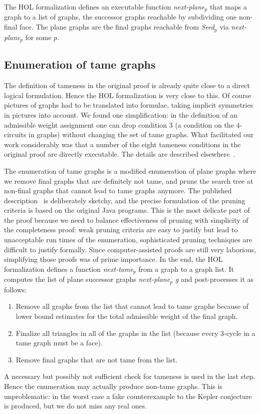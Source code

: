 \documentclass[11pt]{amsart}
\begin{document}
The HOL formalization defines an executable function
\textit{next-plane$_p$} that maps a
graph to a list of graphs, the successor graphs reachable by subdividing one
non-final face.  The plane graphs are the final graphs reachable from
\textit{Seed$_p$} via \textit{next-plane$_p$} for some $p$.

\subsection*{Enumeration of tame graphs}

The definition of tameness in the original proof is already quite close to a direct logical
formulation. Hence the HOL formalization is very close to this. Of course
pictures of graphs had to be translated into formulae, taking implicit
symmetries in pictures into account. We found one simplification: in the
definition of an admissible weight assignment one can drop condition 3
(a condition on the $4$-circuits in graphs)
without changing the set of tame graphs. What facilitated our work
considerably was that a number of the eight tameness conditions 
in the original proof are directly
executable. The details are described elsewhere~\cite{NipkowBS-IJCAR06}.

The enumeration of tame graphs is a modified enumeration of plane graphs
where we remove final graphs that are definitely not tame, and prune the
search tree at non-final graphs that cannot lead to tame graphs anymore.  
The published
description~\cite{Hales:2006:DCG} is deliberately sketchy, and 
the precise formulation of the pruning criteria is based on the
original Java programs.  This
is the most delicate part of the proof because we need to balance
effectiveness of pruning with simplicity of the completeness proof: weak
pruning criteria are easy to justify but lead to unacceptable run times of
the enumeration, sophisticated pruning techniques are difficult to justify
formally. Since computer-assisted proofs are still very laborious,
simplifying those proofs was of prime importance. In the end, the HOL
formalization defines a function \textit{next-tame$_p$}
from a graph to a graph list. It computes the list of plane successor graphs
\textit{next-plane$_p$ g} and post-processes it as follows:
\begin{enumerate}
\item Remove all graphs from the list that cannot lead to tame graphs
because of lower bound estimates for the total admissible weight of the final
graph.
\item Finalize all triangles in all of the graphs in the list
(because every 3-cycle in a tame graph must be a face).
\item Remove final graphs that are not tame from the list.
\end{enumerate}
A necessary but possibly not sufficient check for tameness is used in the last
step. Hence the enumeration may actually produce non-tame graphs. This is
unproblematic: in the worst case a fake counterexample to the Kepler
conjecture is produced, but we do not miss any real ones.
\end{document}
